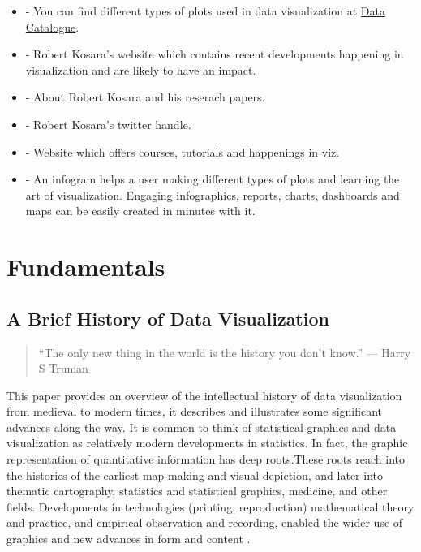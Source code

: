 \documentclass[]{book}
\providecommand{\tightlist}{%
  \setlength{\itemsep}{0pt}\setlength{\parskip}{0pt}}
\theoremstyle{definition}
\theoremstyle{definition}
\theoremstyle{definition}
\theoremstyle{remark}
\begin{document}
\begin{itemize}
\tightlist
\item
  \citep{charts_viz} - You can find different types of plots used in
  data visualization at
  \href{https://datavizcatalogue.com/search.html}{Data Catalogue}.
\item
  \citep{eagereyes_viz} - Robert Kosara's website which contains recent
  developments happening in visualization and are likely to have an
  impact.
\item
  \citep{research_viz} - About Robert Kosara and his reserach papers.
\item
  \citep{twitter_Kosara} - Robert Kosara's twitter handle.
\item
  \citep{flowingdata} - Website which offers courses, tutorials and
  happenings in viz.
\item
  \citep{infogram} - An infogram helps a user making different types of
  plots and learning the art of visualization. Engaging infographics,
  reports, charts, dashboards and maps can be easily created in minutes
  with it.
\end{itemize}

\chapter{Fundamentals}\label{fundamentals}

\section{A Brief History of Data
Visualization}\label{a-brief-history-of-data-visualization}

\begin{quote}
``The only new thing in the world is the history you don't know.'' ---
Harry S Truman
\end{quote}

This paper provides an overview of the intellectual history of data
visualization from medieval to modern times, it describes and
illustrates some significant advances along the way. It is common to
think of statistical graphics and data visualization as relatively
modern developments in statistics. In fact, the graphic representation
of quantitative information has deep roots.These roots reach into the
histories of the earliest map-making and visual depiction, and later
into thematic cartography, statistics and statistical graphics,
medicine, and other fields. Developments in technologies (printing,
reproduction) mathematical theory and practice, and empirical
observation and recording, enabled the wider use of graphics and new
advances in form and content \citep{data_viz_history}.
\end{document}
